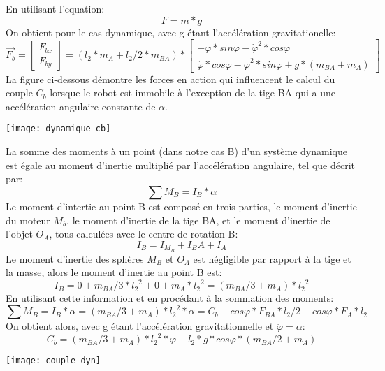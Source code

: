 \documentclass{udes_rapport} %
\begin{document}
En utilisant l'equation:
\begin{equation}
	F = m*g
\end{equation}
On obtient pour le cas dynamique, avec g étant l'accélération gravitationelle:
	\[	\overrightarrow {F_b} =  \begin{bmatrix}
	F_{bx}\\ 
	F_{by}
	\end{bmatrix} = (l_2*m_A + l_2/2*m_{BA}) * \begin{bmatrix}
	-\ddot{\varphi}*sin\varphi-\dot{\varphi}^{2}*cos\varphi\\
	\ddot{\varphi}*cos\varphi-\dot{\varphi}^{2}*sin\varphi + g*(m_{BA}+m_A)
	\end{bmatrix}	\]
La figure ci-dessous démontre les forces en action qui influencent le calcul du couple $C_b$ lorsque le robot est immobile à l'exception de la tige BA qui a une accélération angulaire constante de $\alpha$.
\begin{center}
	\centering
	\texttt{[image: dynamique\_cb]}
	\label{dynamique_cb}
\end{center}
La somme des moments à un point (dans notre cas B) d'un système dynamique est égale au moment d'inertie multiplié par l'accélération angulaire, tel que décrit par:
\begin{equation}
	\sum M_B =  I_B*\alpha
\end{equation}
Le moment d'intertie au point B est composé en trois parties, le moment d'inertie du moteur $M_b$, le moment d'inertie de la tige BA, et le moment d'inertie de l'objet $O_A$, tous calculées avec le centre de rotation B:
	\[	I_B = I_{M_B} + I_BA + I_A 	\]
 Le moment d'inertie des sphères $M_B$ et $O_A$ est négligible par rapport à la tige et la masse, alors le moment d'inertie au point B est:
	\[	I_B = 0 + m_{BA}/3*{l_2}^{2} + 0 + m_A*{l_2}^{2} =  (m_{BA}/3 + m_A)*{l_2}^{2}	\]
En utilisant cette information et en procédant à la sommation des moments:
	\[	\sum M_B =  I_B*\alpha =  (m_{BA}/3 + m_A)*{l_2}^{2}*\alpha = C_b - cos\varphi*F_{BA}*l_2/2 - cos\varphi*F_A*l_2   \]
On obtient alors, avec g étant l'accélération gravitationnelle et $\ddot{\varphi} = \alpha$:
	\[	C_b = (m_{BA}/3 + m_A)*{l_2}^{2}*\ddot{\varphi} +  l_2*g*cos\varphi*(m_{BA}/2+m_A)	\]
\begin{center}
	\centering
	\texttt{[image: couple\_dyn]}
	\label{couple_dynamique}
\end{center}
\end{document}
